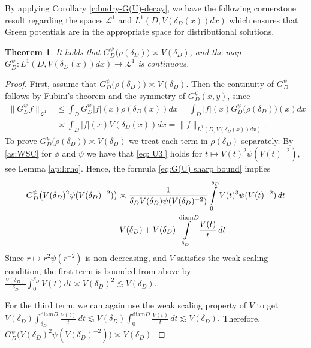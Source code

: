 \documentclass[12pt,a4paper,onecolumn]{article}
\newtheorem{thm}{Theorem}[section]
\theoremstyle{definition}
\newcommand{\1}{\mathbf 1}
\newcommand{\de}{\delta_D}
\newcommand{\LLL}{L^1(D,V(\de(x))dx)}
\newcommand{\calL}{\mathcal{L}^1}
\newcommand{\GDP}{G_D^\psi}
\newcommand{\diam}{\textrm{diam}}
\numberwithin{equation}{section}
\begin{document}
     By applying Corollary \ref{c:bndry-G(U)-decay}, we have the following cornerstone result regarding the spaces $\calL$ and $\LLL$ which ensures that Green potentials are in the appropriate space for distributional solutions.
    \begin{thm}\label{t:conti-GDP-L1}
        It holds that $\GDP\big(\rho(\de)\big)\asymp V(\de)$, and the map $\GDP:\LLL\to \calL$
        is continuous.
    \end{thm}
    \begin{proof}
    First, assume that $\GDP\big(\rho(\de)\big)\asymp V(\de)$. Then the continuity of $\GDP$ follows by Fubini's theorem and the symmetry of $G_D^\psi(x,y)$, since
    \begin{align*}
        \|\GDP f\|_{\calL}&\le \int_D \GDP|f|(x)\rho(\de(x))dx=\int_D |f|(x)\GDP\big(\rho(\de)\big)(x)dx\\
        &\asymp \int_D |f|(x)V(\de(x))dx=\|f\|_{\LLL}.
    \end{align*}
 To prove $\GDP\big(\rho(\de)\big)\asymp V(\de)$ we treat each term in $\rho(\de)$ separately. By \ref{as:WSC} for $\phi$ and $\psi$ we have that \eqref{eq: U3'} holds for $t\mapsto V(t)^2\psi(V(t)^{-2})$, see Lemma \ref{ap:l:rho}. Hence, the formula \eqref{eq:G(U) sharp bound} implies
    \begin{align*}
        \GDP\big(V(\de)^2\psi(V(\de)^{-2})\big)&\asymp \frac{1}{\de V(\de)\psi(V(\de)^{-2})}\int\limits_0^{\de}V(t)^3\psi(V(t)^{-2})\, dt\\
    			&\hspace{-1em}+
    			V(\de)+V(\de)\int\limits_{\de}^{\diam D}
    			\frac{V(t)}{t}\, dt\,.  
    \end{align*}
    Since $r\mapsto r^2\psi(r^{-2})$ is non-decreasing, and $V$ satisfies the weak scaling condition, the first term is bounded from above by $\frac{V(\de)}{\de}\int_0^{\de} V(t)dt\asymp  V(\de)^2\lesssim V(\de).$
     
    For the third term, we can again use the weak scaling property of $V$ to get $V(\de)\int_{\de}^{\diam D}
    			\frac{V(t)}{t}\, dt\lesssim  V(\de)\int_{0}^{\diam D}
    			\frac{V(t)}{t}\, dt\lesssim V(\de).$
    Therefore, $\GDP\big(V(\de)^2\psi(V(\de)^{-2})\big)\asymp V(\de)$.


\end{proof}
\end{document}
